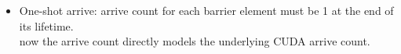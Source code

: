 \begin{itemize}
  \item One-shot arrive: arrive count for each barrier element must be 1 at the end of its lifetime.\\
     now the arrive count directly models the underlying CUDA arrive count.
\end{itemize}


